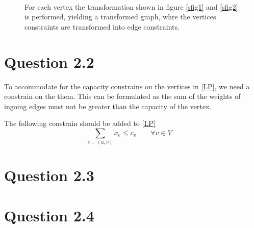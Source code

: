 \documentclass[10pt]{article}
\begin{document}
\begin{figure}[ht]
\centering
\mbox{
     \quad
}                    
\caption{For each vertex the transformation shown in figure \ref{sfig1} and \ref{sfig2} is performed, yielding a transformed graph, whre the vertices constraints are transformed into edge constraints.}
\label{fig1}
\end{figure}



\section*{Question 2.2} %
\label{sec:question_2_2}
To accommodate for the capacity constrains on the vertices in \eqref{LP}, we need a constrain on the them.
This can be formulated as the sum of the weights of ingoing edges must not be greater than the capacity of the vertex.

The following constrain should be added to \eqref{LP}
\begin{equation}
	\sum_{e=(u,v)} x_e \leq c_v \qquad \forall v \in V \quad 
\end{equation} 

\section*{Question 2.3} %
\label{sec:question_2_3}


\section*{Question 2.4} %
\label{sec:question_2_4}
\end{document}
